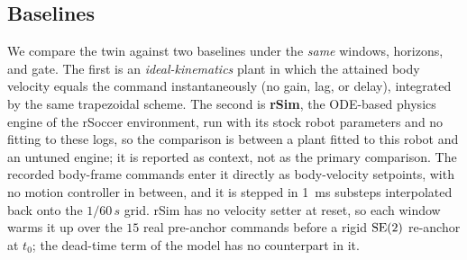 \subsection{Baselines}
\label{sec:method:baselines}
We compare the twin against two baselines under the \emph{same} windows, horizons, and gate. The first is an \emph{ideal-kinematics} plant in which the attained body velocity equals the command instantaneously (no gain, lag, or delay), integrated by the same trapezoidal scheme. The second is \textbf{rSim}, the ODE-based physics engine of the rSoccer environment, run with its stock robot parameters and no fitting to these logs, so the comparison is between a plant fitted to this robot and an untuned engine; it is reported as context, not as the primary comparison. The recorded body-frame commands enter it directly as body-velocity setpoints, with no motion controller in between, and it is stepped in \SI{1}{ms} substeps interpolated back onto the $1/60\,\si{s}$ grid. rSim has no velocity setter at reset, so each window warms it up over the $15$ real pre-anchor commands before a rigid $\mathrm{SE}(2)$ re-anchor at $t_0$; the dead-time term of the model has no counterpart in it.



